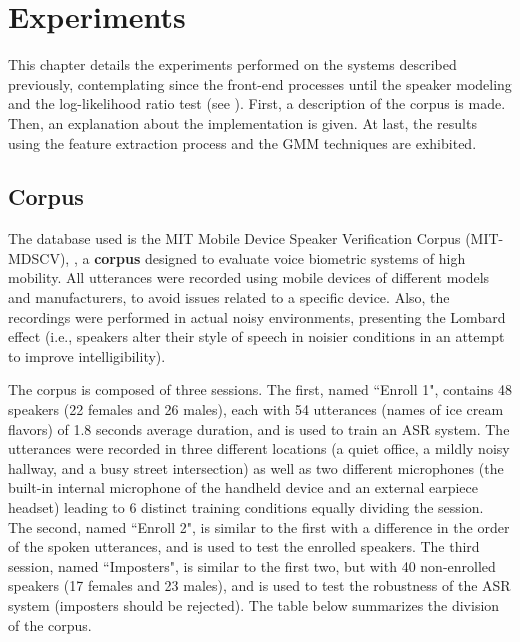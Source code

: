 \chapter{Experiments}
\label{ch:experiments}

This chapter details the experiments performed on the systems described previously, contemplating since the front-end processes until the speaker modeling and the log-likelihood ratio test (see ). First, a description of the corpus is made. Then, an explanation about the implementation is given. At last, the results using the feature extraction process and the GMM techniques are exhibited.

\section{Corpus}
\label{sec:corpus}

The database used is the MIT Mobile Device Speaker Verification Corpus (MIT-MDSCV), , a \textbf{corpus} designed to evaluate voice biometric systems of high mobility. All utterances were recorded using mobile devices of different models and manufacturers, to avoid issues related to a specific device. Also, the recordings were performed in actual noisy environments, presenting the Lombard effect (i.e., speakers alter their style of speech in noisier conditions in an attempt to improve intelligibility).

The corpus is composed of three sessions. The first, named ``Enroll 1", contains 48 speakers (22 females and 26 males), each with 54 utterances (names of ice cream flavors) of 1.8 seconds average duration, and is used to train an ASR system. The utterances were recorded in three different locations (a quiet office, a mildly noisy hallway, and a busy street intersection) as well as two different microphones (the built-in internal microphone of the handheld device and an external earpiece headset) leading to 6 distinct training conditions equally dividing the session. The second, named ``Enroll 2", is similar to the first with a difference in the order of the spoken utterances, and is used to test the enrolled speakers. The third session, named ``Imposters", is similar to the first two, but with 40 non-enrolled speakers (17 females and 23 males), and is used to test the robustness of the ASR system (imposters should be rejected). The table below summarizes the division of the corpus.

